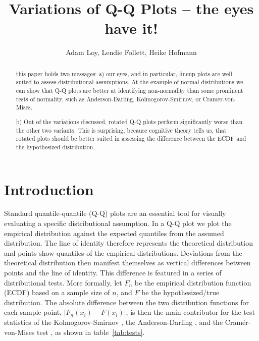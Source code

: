 \documentclass{article}\usepackage[]{graphicx}\usepackage[]{color}
\title{Variations of Q-Q Plots -- the eyes have it!}
\author{Adam Loy, Lendie Follett, Heike Hofmann}
\begin{document}
\maketitle
\begin{abstract}
this paper holds two messages: 
a) our eyes, and in particular, lineup plots are well suited to assess distributional assumptions. At the example of normal distributions we can show that Q-Q plots are better at identifying non-normality than some prominent tests of normality, such as  Anderson-Darling,  Kolmogorov-Smirnov, or  Cramer-von-Mises.

b) Out of the variations discussed, rotated Q-Q plots perform significantly worse than the other two variants. This is surprising, because cognitive theory tells us, that rotated plots should be better suited in assessing the difference between the ECDF and the hypothesized distribution.
\end{abstract}











\section{Introduction}

Standard quantile-quantile (Q-Q) plots \citep{Wilk:1968} are an essential tool for  visually evaluating a specific distributional assumption. In a Q-Q plot we plot the empirical distribution against the expected quantiles from the assumed distribution. The line of identity therefore represents the theoretical distribution and points show quantiles of the empirical distributions. Deviations from the theoretical distribution then manifest themselves as vertical differences between points and the line of identity. This difference is featured in a series of distributional tests. More formally, let $F_n$ be the empirical distribution function (ECDF) based on a sample size of $n$, and $F$ be the hypothesized/true distribution. The absolute difference between the two distribution functions for each sample point, $\left| F_n(x_i) - F(x_i) \right|$, is then the main contributor for the test statistics of the Kolmogorov-Smirnov \cite[KS-test,][]{kolmogorov:1933, smirnov:1948}, the Anderson-Darling \citep[AD-test,][]{adtest:1954}, and the Cram\'{e}r-von-Mises test \citep[CVM-test,][]{cramer:1928, mises:1928}, as shown in table~\ref{tab:tests}.
\end{document}
